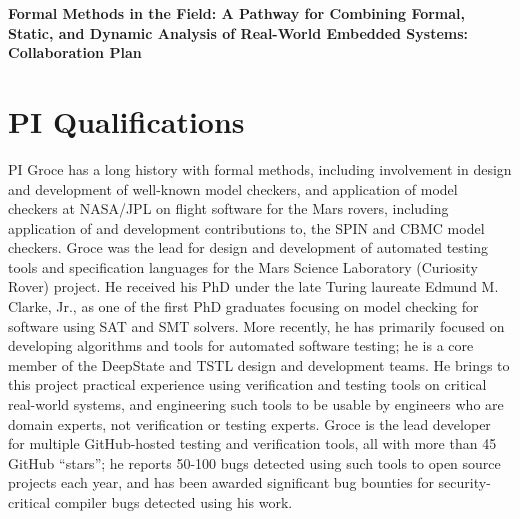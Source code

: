 \documentclass{article}
\begin{document}
\begin{center}
{\Large\sf\textbf{Formal Methods in the Field: A Pathway for Combining Formal, Static, and Dynamic Analysis of Real-World Embedded Systems: Collaboration Plan}}
\end{center}

\section{PI Qualifications}

PI Groce has a long history with formal methods, including involvement in design and development of well-known model checkers, and application of model checkers at NASA/JPL on flight software for the Mars rovers, including application of and development contributions to, the SPIN and CBMC model checkers.  Groce was the lead for design and development of automated testing tools and specification languages for the Mars Science Laboratory (Curiosity Rover) project.  He received his PhD under the late Turing laureate Edmund M. Clarke, Jr., as one of the first PhD graduates focusing on model checking for software using SAT and SMT solvers.  More recently, he has primarily focused on developing algorithms and tools for automated software testing; he is a core member of the DeepState and TSTL design and development teams.  He brings to this project practical experience using verification and testing tools on critical real-world systems, and engineering such tools to be usable by engineers who are domain experts, not verification or testing experts.  Groce is the lead developer for multiple GitHub-hosted testing and verification tools, all with more than 45 GitHub ``stars''; he reports 50-100 bugs detected using such tools to open source projects each year, and has been awarded significant bug bounties for security-critical compiler bugs detected using his work.
\end{document}
